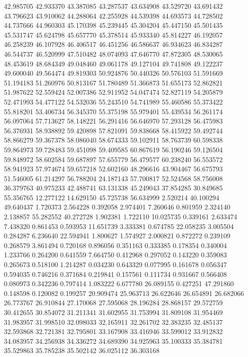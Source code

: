 42.985705
42.933370
43.387085
43.287537
43.634908
43.529720
43.691432
43.796623
43.910062
44.288064
42.255928
44.539398
44.693573
44.728502
44.737666
44.960303
45.170398
45.239445
45.304204
45.447150
45.501435
45.531747
45.624798
45.657770
45.378514
45.933340
45.814227
46.192057
46.258239
46.107928
46.406517
46.451256
46.586637
46.934623
46.834287
46.544737
46.520999
47.510482
48.074093
47.646770
47.872305
48.530065
48.453619
48.684349
49.048460
49.061178
49.127104
49.741808
49.122237
49.600040
49.564474
49.819303
50.924876
50.440326
50.576103
51.591669
51.194183
51.260976
50.813167
51.780489
51.366873
51.655173
52.862821
51.987622
52.559424
52.007386
52.911952
54.047474
52.827119
54.205879
52.471993
54.477122
54.532036
55.243510
54.741989
55.460586
55.373422
55.818201
53.406734
56.345370
55.375198
55.979401
55.439534
56.261174
56.097064
57.713627
58.148221
56.291416
56.646970
57.293128
56.475983
56.376931
58.938892
59.420898
57.821091
59.838668
58.415922
59.492744
58.866279
59.367378
58.086040
58.674333
59.102911
58.763739
60.598338
59.864973
59.728483
59.451098
59.409585
60.867619
56.190246
59.126504
59.848972
58.602584
59.687897
57.655779
56.479577
60.238240
56.553572
58.941923
57.974674
59.657218
52.602160
48.296616
43.904467
56.675793
51.546005
61.214297
56.788204
24.187143
57.700817
52.524568
58.756008
36.379763
40.975233
42.488741
63.131338
45.249043
37.854285
30.849685
55.356765
12.277122
14.629150
45.725738
56.634999
2.520214
40.100294
49.640437
1.720373
2.564228
0.392058
2.974401
7.260646
0.801959
2.324140
2.138857
55.282552
40.272728
1.902381
1.722110
10.025735
0.339161
2.633474
7.438320
0.861453
0.593953
11.651739
3.333381
0.674785
22.058235
3.005504
0.284287
6.236640
22.594941
1.800627
1.574927
2.000821
0.872272
0.239109
0.268579
3.861494
0.720168
0.896056
0.351163
0.333385
0.178354
0.340004
1.233766
0.264200
0.641559
7.664750
0.412968
0.297052
0.143220
0.359083
0.265673
0.518100
1.214287
0.034230
0.643329
0.077995
0.161678
0.056347
0.594035
0.746216
0.371684
0.219841
0.157561
0.111734
0.931667
0.566408
0.080973
0.342236
0.797414
1.083222
6.677780
26.089155
0.427251
47.291860
0.148598
0.120082
0.199257
20.909474
25.963713
26.622646
26.654891
26.682066
26.773767
26.910844
27.170068
27.595068
28.196284
28.868157
29.572759
30.412655
30.854072
31.211341
31.602955
31.753994
31.809108
31.954469
31.983957
31.998510
32.098033
32.165911
32.261702
32.383235
32.485137
32.593868
32.721381
32.795801
33.167908
33.416946
33.599012
33.912832
34.083957
34.256938
34.336272
34.689390
34.925963
35.100333
35.384781
35.529863
35.785238
35.502142
36.025112
36.303168

